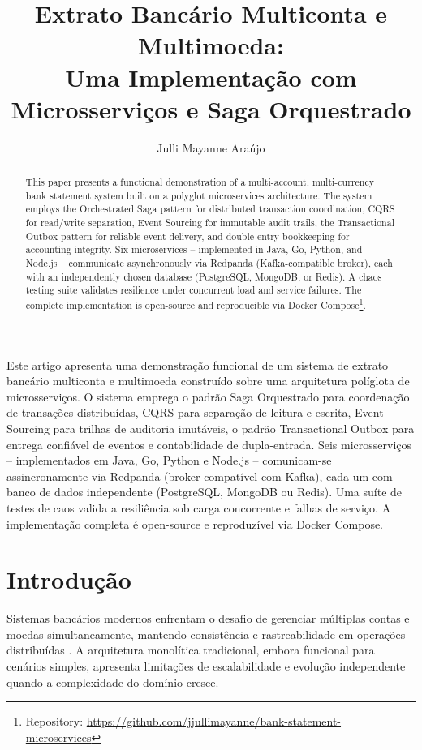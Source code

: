 \documentclass[12pt]{article}
\title{Extrato Banc\'{a}rio Multiconta e Multimoeda:\\Uma Implementa\c{c}\~{a}o com Microsservi\c{c}os e Saga Orquestrado}
\author{Julli Mayanne Ara\'{u}jo\inst{1}}
\begin{document}
\maketitle

\begin{abstract}
This paper presents a functional demonstration of a multi-account, multi-currency bank statement system built on a polyglot microservices architecture. The system employs the Orchestrated Saga pattern for distributed transaction coordination, CQRS for read/write separation, Event Sourcing for immutable audit trails, the Transactional Outbox pattern for reliable event delivery, and double-entry bookkeeping for accounting integrity. Six microservices -- implemented in Java, Go, Python, and Node.js -- communicate asynchronously via Redpanda (Kafka-compatible broker), each with an independently chosen database (PostgreSQL, MongoDB, or Redis). A chaos testing suite validates resilience under concurrent load and service failures. The complete implementation is open-source and reproducible via Docker Compose\footnote{Repository: \url{https://github.com/jjullimayanne/bank-statement-microservices}}.
\end{abstract}

\begin{resumo}
Este artigo apresenta uma demonstra\c{c}\~{a}o funcional de um sistema de extrato banc\'{a}rio multiconta e multimoeda constru\'{i}do sobre uma arquitetura pol\'{i}glota de microsservi\c{c}os. O sistema emprega o padr\~{a}o Saga Orquestrado para coordena\c{c}\~{a}o de transa\c{c}\~{o}es distribu\'{i}das, CQRS para separa\c{c}\~{a}o de leitura e escrita, Event Sourcing para trilhas de auditoria imut\'{a}veis, o padr\~{a}o Transactional Outbox para entrega confi\'{a}vel de eventos e contabilidade de dupla-entrada. Seis microsservi\c{c}os -- implementados em Java, Go, Python e Node.js -- comunicam-se assincronamente via Redpanda (broker compat\'{i}vel com Kafka), cada um com banco de dados independente (PostgreSQL, MongoDB ou Redis). Uma su\'{i}te de testes de caos valida a resili\^{e}ncia sob carga concorrente e falhas de servi\c{c}o. A implementa\c{c}\~{a}o completa \'{e} open-source e reproduz\'{i}vel via Docker Compose.
\end{resumo}


\section{Introdu\c{c}\~{a}o}

Sistemas banc\'{a}rios modernos enfrentam o desafio de gerenciar m\'{u}ltiplas contas e moedas simultaneamente, mantendo consist\^{e}ncia e rastreabilidade em opera\c{c}\~{o}es distribu\'{i}das \cite{kleppmann2017}. A arquitetura monol\'{i}tica tradicional, embora funcional para cen\'{a}rios simples, apresenta limita\c{c}\~{o}es de escalabilidade e evolu\c{c}\~{a}o independente quando a complexidade do dom\'{i}nio cresce.
\end{document}

